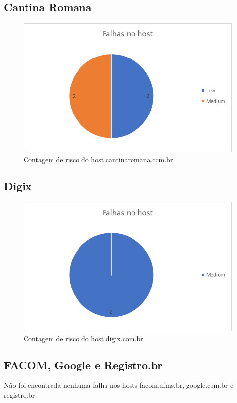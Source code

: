 \documentclass[
	12pt,				%
	openright,			%
	twoside,			%
	a4paper,			%
	english,			%
	french,				%
	spanish,			%
	brazil				%
	]{abntex2}
\begin{document}
\subsection{Cantina Romana}
\begin{figure}[h]
	\centering
	\includegraphics[width=0.7\linewidth]{Imagens/CantinaRomana}
	\caption[Cantina Romana]{Contagem de risco do host cantinaromana.com.br}
	\label{fig:cantinaromana}
\end{figure}

\subsection{Digix}
\begin{figure}[h]
	\centering
	\includegraphics[width=0.7\linewidth]{Imagens/Digix}
	\caption[Digix]{Contagem de risco do host digix.com.br}
	\label{fig:digix}
\end{figure}

\subsection{FACOM, Google e Registro.br}
Não foi encontrada nenhuma falha nos hosts facom.ufms.br, google.com.br e registro.br
\end{document}
